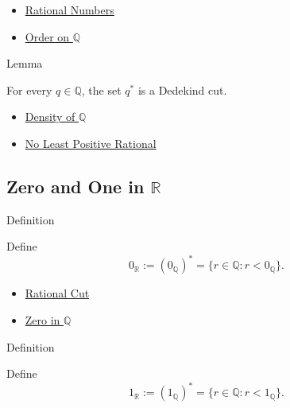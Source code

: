 \begin{dependencies}
\begin{itemize}
  \item \hyperref[def:rationals]{Rational Numbers}
  \item \hyperref[def:order-on-q]{Order on $\mathbb{Q}$}
\end{itemize}
\end{dependencies}

\begin{lemmabox}{Lemma}
\begin{lemma}
\label{lem:rational-cut-is-a-cut}
For every $q\in\mathbb{Q}$, the set $q^{\ast}$ is a Dedekind cut.
\end{lemma}
\end{lemmabox}

\begin{dependencies}
\begin{itemize}
  \item \hyperref[thm:density-of-q]{Density of $\mathbb{Q}$}
  \item \hyperref[prop:no-least-positive-rational]{No Least Positive Rational}
\end{itemize}
\end{dependencies}

\subsection*{\texorpdfstring{Zero and One in $\mathbb{R}$}{Zero and One in R}}

\begin{definitionbox}{Definition}
\begin{definition}
\label{def:zero-in-r}
Define
\[
0_{\mathbb{R}}:=(0_{\mathbb{Q}})^{\ast}
=\{r\in\mathbb{Q}:r<0_{\mathbb{Q}}\}.
\]
\end{definition}
\end{definitionbox}

\begin{dependencies}
\begin{itemize}
  \item \hyperref[def:rational-cut]{Rational Cut}
  \item \hyperref[def:zero-in-q]{Zero in $\mathbb{Q}$}
\end{itemize}
\end{dependencies}

\begin{definitionbox}{Definition}
\begin{definition}
\label{def:one-in-r}
Define
\[
1_{\mathbb{R}}:=(1_{\mathbb{Q}})^{\ast}
=\{r\in\mathbb{Q}:r<1_{\mathbb{Q}}\}.
\]
\end{definition}
\end{definitionbox}

